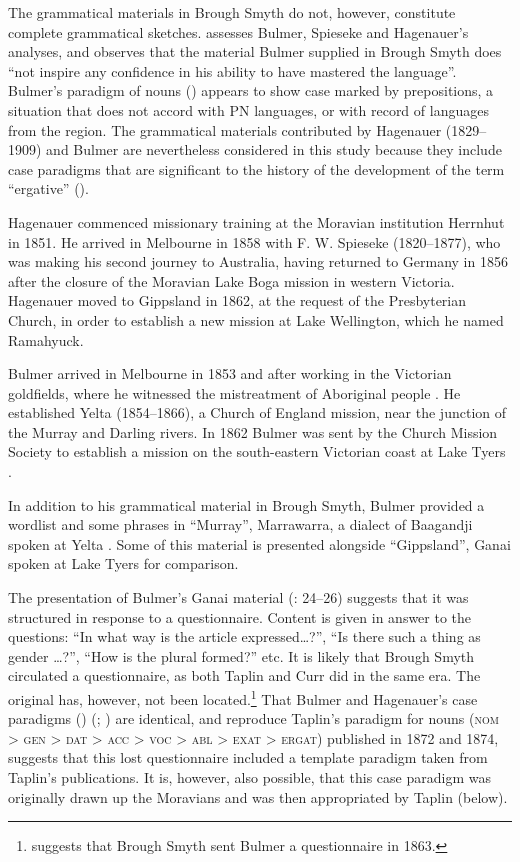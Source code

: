 The grammatical materials in Brough Smyth do not, however, constitute complete grammatical sketches. \citet{Blake2016} assesses Bulmer, Spieseke and Hagenauer’s analyses, and observes that the material Bulmer supplied in Brough Smyth does “not inspire any confidence in his ability to have mastered the language”. Bulmer’s paradigm of nouns () appears to show case marked by prepositions, a situation that does not accord with PN languages, or with  record of languages from the region. The grammatical materials contributed by Hagenauer (1829–1909) and Bulmer are nevertheless considered in this study because they include case paradigms that are significant to the history of the development of the term “ergative” ().

Hagenauer commenced missionary training at the Moravian institution Herrnhut in 1851. He arrived in Melbourne in 1858 with F. W. Spieseke (1820--1877), who was making his second journey to Australia, having returned to Germany in 1856 after the closure of the Moravian Lake Boga mission in western Victoria. Hagenauer moved to Gippsland in 1862, at the request of the Presbyterian Church, in order to establish a new mission at Lake Wellington, which he named Ramahyuck.

Bulmer arrived in Melbourne in 1853 and after working in the Victorian goldfields, where he witnessed the mistreatment of Aboriginal people \citep[166]{harris_one_1994}. He established Yelta (1854--1866), a Church of England mission, near the junction of the Murray and Darling rivers. In {1862} Bulmer was sent by the Church Mission Society to establish a mission on the south-eastern Victorian coast at Lake Tyers \citep[5--7]{shaw_194_nodate}.

In addition to his grammatical material in Brough Smyth, Bulmer provided a wordlist and some phrases in “Murray'', Marrawarra, a dialect of Baagandji spoken at Yelta \citep[33--37]{bulmer_language_1878}. Some of this material is presented alongside ``Gippsland'', Ganai spoken at Lake Tyers for comparison.

The presentation of Bulmer’s Ganai material (\citeyear{smyth_aborigines_1878}: 24--26) suggests that it was structured in response to a questionnaire. Content is given in answer to the questions: “In what way is the article expressed…?”, “Is there such a thing as gender …?”, “How is the plural formed?” etc. It is likely that Brough Smyth circulated a questionnaire, as both Taplin and Curr did in the same era. The original has, however, not been located.\footnote{\citet{blake_nineteenth-century_2015} suggests
    that Brough Smyth sent Bulmer a questionnaire in 1863.
}  That Bulmer and Hagenauer’s case paradigms (\citeyear{bulmer_language_1878}) (; ) are identical, and reproduce Taplin’s paradigm for nouns (\textsc{nom} > \textsc{gen} > \textsc{dat} > \textsc{acc} > \textsc{voc} > \textsc{abl} > \textsc{exat} > \textsc{ergat}) published in 1872 and 1874, suggests that this lost questionnaire included a template paradigm taken from Taplin’s publications. It is, however, also possible, that this case paradigm was originally drawn up the Moravians and was then appropriated by Taplin (below).

